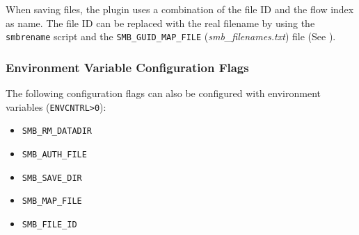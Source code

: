 \documentclass[documentation]{subfiles}
\begin{document}
When saving files, the plugin uses a combination of the file ID and the flow index as name. The file ID can be replaced with the real filename by using the {\tt smbrename} script and the {\tt SMB\_GUID\_MAP\_FILE} ({\em smb\_filenames.txt}) file (See ).

\subsubsection{Environment Variable Configuration Flags}
The following configuration flags can also be configured with environment variables ({\tt ENVCNTRL>0}):
\begin{itemize}
    \item {\tt SMB\_RM\_DATADIR}
    \item {\tt SMB\_AUTH\_FILE}
    \item {\tt SMB\_SAVE\_DIR}
    \item {\tt SMB\_MAP\_FILE}
    \item {\tt SMB\_FILE\_ID}
\end{itemize}
\end{document}
